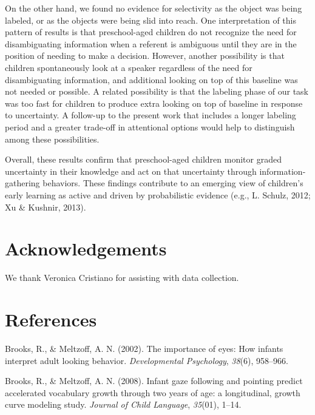 \documentclass[10pt, letterpaper]{article}
\begin{document}
On the other hand, we found no evidence for selectivity as the object
was being labeled, or as the objects were being slid into reach. One
interpretation of this pattern of results is that preschool-aged
children do not recognize the need for disambiguating information when a
referent is ambiguous until they are in the position of needing to make
a decision. However, another possibility is that children spontaneously
look at a speaker regardless of the need for disambiguating information,
and additional looking on top of this baseline was not needed or
possible. A related possibility is that the labeling phase of our task
was too fast for children to produce extra looking on top of baseline in
response to uncertainty. A follow-up to the present work that includes a
longer labeling period and a greater trade-off in attentional options
would help to distinguish among these possibilities.

Overall, these results confirm that preschool-aged children monitor
graded uncertainty in their knowledge and act on that uncertainty
through information-gathering behaviors. These findings contribute to an
emerging view of children's early learning as active and driven by
probabilistic evidence (e.g., L. Schulz, 2012; Xu \& Kushnir, 2013).

\section{Acknowledgements}\label{acknowledgements}

We thank Veronica Cristiano for assisting with data collection.

\section{References}\label{references}

\setlength{\parindent}{-0.1in} \setlength{\leftskip}{0.125in} \noindent

\hypertarget{refs}{}
\hypertarget{ref-Brooks2002}{}
Brooks, R., \& Meltzoff, A. N. (2002). The importance of eyes: How
infants interpret adult looking behavior. \emph{Developmental
Psychology}, \emph{38}(6), 958--966.

\hypertarget{ref-Brooks2008}{}
Brooks, R., \& Meltzoff, A. N. (2008). Infant gaze following and
pointing predict accelerated vocabulary growth through two years of age:
a longitudinal, growth curve modeling study. \emph{Journal of Child
Language}, \emph{35}(01), 1--14.
\end{document}

